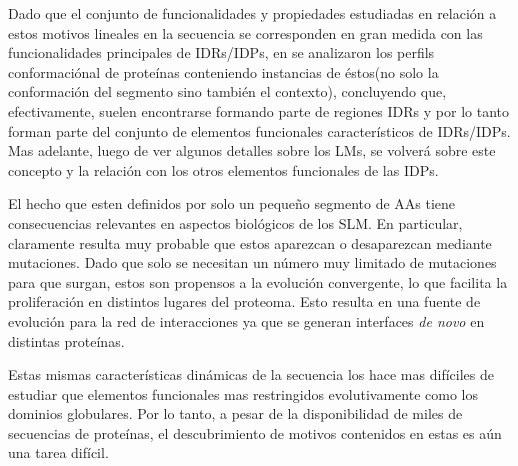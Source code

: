 Dado que el conjunto de funcionalidades y propiedades estudiadas en relación a estos motivos lineales en la secuencia se corresponden en gran medida con las funcionalidades principales de IDRs/IDPs, en \cite{fuxreiter2007local} se
analizaron los perfils conformaciónal de proteínas conteniendo instancias de éstos(no solo la conformación del segmento sino también el contexto), concluyendo que, efectivamente, 
suelen encontrarse formando parte de regiones IDRs y por lo tanto forman parte del conjunto de elementos funcionales característicos de IDRs/IDPs.
Mas adelante, luego de ver algunos detalles sobre los LMs, se volverá sobre este concepto y la relación con los otros elementos funcionales de las IDPs.


El hecho que esten definidos por solo un pequeño segmento de AAs tiene consecuencias relevantes en aspectos biológicos de los SLM.
En particular, claramente resulta muy probable que estos aparezcan o desaparezcan mediante mutaciones. 
Dado que solo se necesitan un número muy limitado de mutaciones para que surgan, estos son propensos a la evolución convergente, lo que facilita la proliferación en distintos lugares del proteoma.
Esto resulta en una fuente de evolución para la red de interacciones ya que se generan interfaces \textit{de novo} en distintas proteínas.

Estas mismas características dinámicas de la secuencia los hace mas difíciles de estudiar que elementos funcionales mas restringidos evolutivamente como los dominios globulares.
Por lo tanto, a pesar de la disponibilidad de miles de secuencias de proteínas, el descubrimiento de motivos contenidos en estas es aún una tarea difícil.







